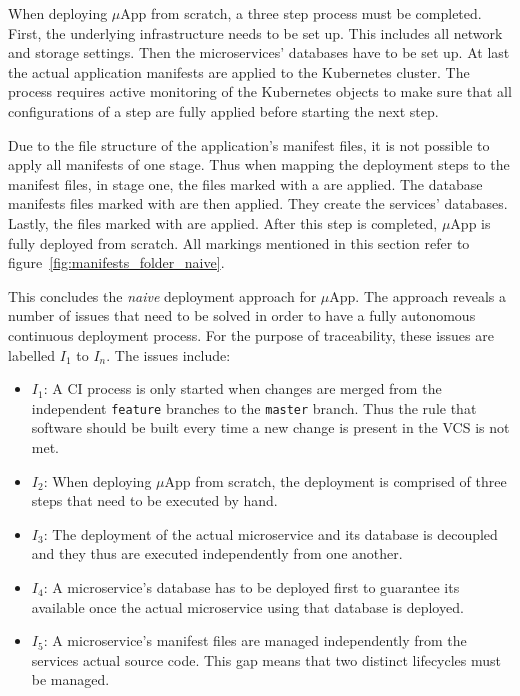 When deploying $\mu$App from scratch, a three step process must be completed.
First, the underlying infrastructure needs to be set up. This includes all
network and storage settings. Then the microservices' databases have to be set
up. At last the actual application manifests are applied to the Kubernetes
cluster. The process requires active monitoring of the Kubernetes objects to
make sure that all configurations of a step are fully applied before starting
the next step.

Due to the file structure of the application's manifest files, it is not
possible to apply all manifests of one stage. Thus when mapping the deployment
steps to the manifest files, in stage one, the files marked with a
\inlineDiamond{} are applied. The database manifests files marked with
\inlineRectangle{} are then applied. They create the services' databases.
Lastly, the files marked with \inlineTriangle{} are applied. After this step is
completed, $\mu$App is fully deployed from scratch. All markings mentioned in
this section refer to figure~\ref{fig:manifests_folder_naive}.

This concludes the \textit{naive} deployment approach for $\mu$App. The
approach reveals a number of issues that need to be solved in order to have a
fully autonomous continuous deployment process. For the purpose of
traceability, these issues are labelled $I_1$ to $I_n$. The issues include:

\begin{itemize}
  \item \textit{$I_1$}: A \ac{CI} process is only started when changes are
    merged from the independent \texttt{feature} branches to the
    \texttt{master} branch. Thus the rule that software should be built every
    time a new change is present in the \ac{VCS} is not met.
  \item \textit{$I_2$}: When deploying $\mu$App from scratch, the deployment is
    comprised of three steps that need to be executed by hand.
  \item \textit{$I_3$}: The deployment of the actual microservice and its
    database is decoupled and they thus are executed independently from one
    another.
  \item \textit{$I_4$}: A microservice's database has to be deployed first to
    guarantee its available once the actual microservice using that database is
    deployed.
  \item \textit{$I_5$}: A microservice's manifest files are managed
    independently from the services actual source code. This gap means that two
    distinct lifecycles must be managed.
\end{itemize}

